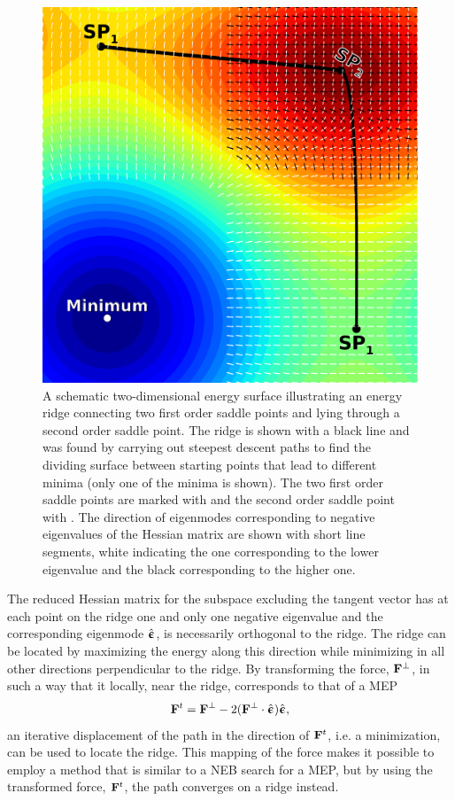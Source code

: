 \begin{figure}[t]
\begin{center}
\includegraphics[width=0.5\linewidth]{figures/modes}
\caption{A schematic two-dimensional energy surface illustrating an energy ridge connecting two first order saddle points and lying through a second order saddle point.
The ridge is shown with a black line and was found by carrying out steepest descent paths to find the dividing surface between starting points that lead to different minima (only one of the minima is shown).
The two first order saddle points are marked with  and the second order saddle point with .
The direction of eigenmodes corresponding to negative eigenvalues of the Hessian matrix are shown with short line segments, white indicating the one corresponding to the lower eigenvalue and the black corresponding to the higher one.
}
\label{fig:modes}
\end{center}
\end{figure}
%

The reduced Hessian matrix for the subspace excluding the tangent vector has at each point on the ridge one and only one negative eigenvalue and the corresponding eigenmode $\hat{{\mathrm{\mathbf{\bm{\upepsilon}}}}}$, is necessarily orthogonal to the ridge.
The ridge can be located by maximizing the energy along this direction while minimizing in all other directions perpendicular to the ridge.
By transforming the force, ${\mathrm{\mathbf{\bm{F}}}}^\perp$, in such a way that it locally, near the ridge, corresponds to that of a MEP %
\begin{equation}
{\ensuremath{\mathrm{\mathbf{\bm{F}}}}}^t = {\mathrm{\mathbf{\bm{F}}}}^\perp - 2 ({\mathrm{\mathbf{\bm{F}}}}^\perp \cdot \hat{{\mathrm{\mathbf{\bm{\upepsilon}}}}}) \hat{{\mathrm{\mathbf{\bm{\upepsilon}}}}},
\label{eq:force-mapping}
\end{equation}
an iterative displacement of the path in the direction of ${\mathrm{\mathbf{\bm{F}}}}^t$, i.e. a minimization, can be used to locate the ridge.
This mapping of the force makes it possible to employ a method that is similar to a NEB search for a MEP, but by using the transformed force, ${\mathrm{\mathbf{\bm{F}}}}^t$, the path converges on a ridge instead.

